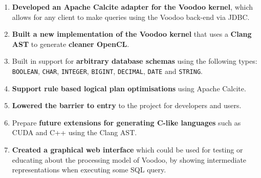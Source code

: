 \begin{enumerate}
    \item \textbf{Developed an Apache Calcite adapter for the Voodoo kernel}, which allows for any client to make queries using the Voodoo back-end via JDBC.
    
    \item \textbf{Built a new implementation of the Voodoo kernel} that uses a \textbf{Clang AST} to generate \textbf{cleaner OpenCL}.

    \item Built in support for \textbf{arbitrary database schemas} using the following types: \texttt{BOOLEAN}, \texttt{CHAR}, \texttt{INTEGER}, \texttt{BIGINT}, \texttt{DECIMAL}, \texttt{DATE} and \texttt{STRING}.
    
    \item \textbf{Support rule based logical plan optimisations} using Apache Calcite.
    
    \item \textbf{Lowered the barrier to entry} to the project for developers and users.
    
    \item Prepare \textbf{future extensions for generating C-like languages} such as CUDA and C++ using the Clang AST.
    
    \item \textbf{Created a graphical web interface} which could be used for testing or educating about the processing model of Voodoo, by showing intermediate representations when executing some SQL query.
\end{enumerate}









